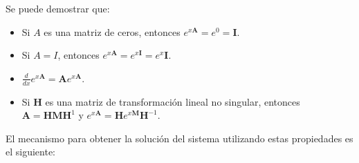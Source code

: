 Se puede demostrar que:

\begin{itemize}
	\item Si $A$ es una matriz de ceros, entonces $e^{x\textbf{A}} = e^0 = \textbf{I}$.
	\item Si $A = I$, entonces $e^{x\textbf{A}} = e^{x\textbf{I}} = e^{x} \textbf{I}$.
	\item $\frac{d}{dx} e^{x\textbf{A}} = \textbf{A} e^{x\textbf{A}}$.
	\item Si $\textbf{H}$ es una matriz de transformación lineal no singular, entonces $\textbf{A} = \textbf{H} \textbf{M} \textbf{H}^{1}$ y $e^{x\textbf{A}} = \textbf{H} e^{x\textbf{M}} \textbf{H}^{-1}$.
\end{itemize}

El mecanismo para obtener la solución del sistema utilizando estas propiedades es el siguiente:

